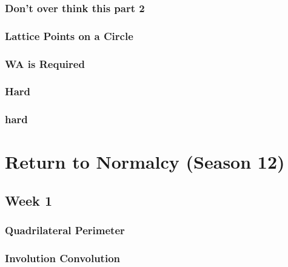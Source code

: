 \documentclass[titlepage=true]{scrartcl}
\begin{document}
        \subsubsection{Don't over think this part 2}
        \label{11.2.1}
        
        \newpage

        \subsubsection{Lattice Points on a Circle}
        \label{11.2.2}
        
        \newpage

        \subsubsection{WA is Required}
        \label{11.2.3}
        
        \newpage

        \subsubsection{Hard}
        \label{11.2.4}
        
        \newpage

        \subsubsection{hard}
        \label{11.2.5}
        
        \newpage

\section{Return to Normalcy (Season 12)}

    \subsection{Week 1}
        
    \subsubsection{Quadrilateral Perimeter}
	\label{12.1.1}
	
	\newpage

    \subsubsection{Involution Convolution}
	\label{12.1.2}
	
	\newpage
\end{document}
